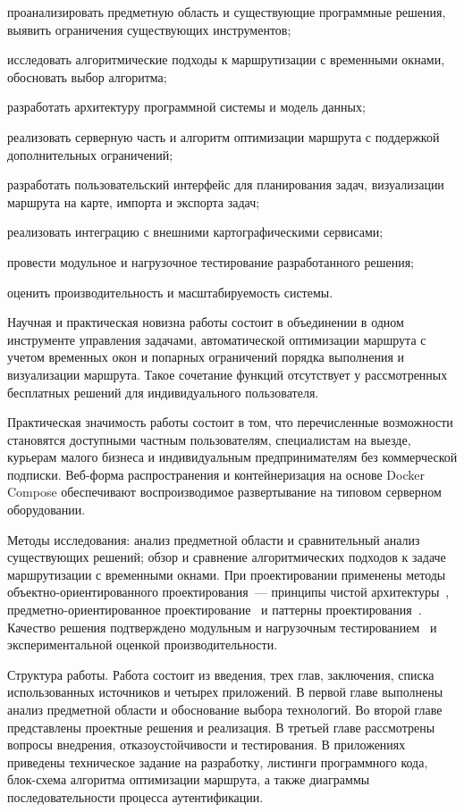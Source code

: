 \begin{compactlist}
      \item проанализировать предметную область и существующие программные решения, выявить ограничения существующих инструментов;
      \item исследовать алгоритмические подходы к маршрутизации с временными окнами, обосновать выбор алгоритма;
      \item разработать архитектуру программной системы и модель данных;
      \item реализовать серверную часть и алгоритм оптимизации маршрута с поддержкой дополнительных ограничений;
      \item разработать пользовательский интерфейс для планирования задач, визуализации маршрута на карте, импорта и экспорта задач;
      \item реализовать интеграцию с внешними картографическими сервисами;
      \item провести модульное и нагрузочное тестирование разработанного решения;
      \item оценить производительность и масштабируемость системы.
\end{compactlist}

Научная и практическая новизна работы состоит в объединении в одном инструменте управления задачами, автоматической оптимизации маршрута с учетом временных окон и попарных ограничений порядка выполнения и визуализации маршрута. Такое сочетание функций отсутствует у рассмотренных бесплатных решений для индивидуального пользователя.

Практическая значимость работы состоит в том, что перечисленные возможности становятся доступными частным пользователям, специалистам на выезде, курьерам малого бизнеса и индивидуальным предпринимателям без коммерческой подписки. Веб-форма распространения и контейнеризация на основе Docker Compose обеспечивают воспроизводимое развертывание на типовом серверном оборудовании.

Методы исследования: анализ предметной области и сравнительный анализ существующих решений; обзор и сравнение алгоритмических подходов к задаче маршрутизации с временными окнами. При проектировании применены методы объектно-ориентированного проектирования~--- принципы чистой архитектуры~\cite{martin2017clean}, предметно-ориентированное проектирование~\cite{evans2011ddd} и паттерны проектирования~\cite{gamma2009patterns}. Качество решения подтверждено модульным и нагрузочным тестированием~\cite{kulikov2017testing,myers2018testing} и экспериментальной оценкой производительности.

Структура работы. Работа состоит из введения, трех глав, заключения, списка использованных источников и четырех приложений. В первой главе выполнены анализ предметной области и обоснование выбора технологий. Во второй главе представлены проектные решения и реализация. В третьей главе рассмотрены вопросы внедрения, отказоустойчивости и тестирования. В приложениях приведены техническое задание на разработку, листинги программного кода, блок-схема алгоритма оптимизации маршрута, а также диаграммы последовательности процесса аутентификации.
